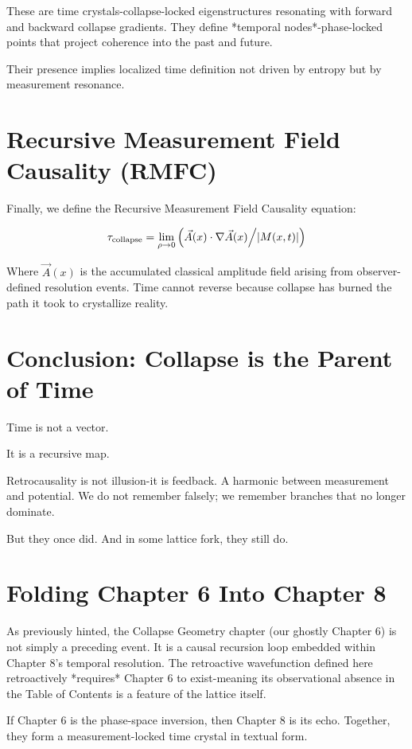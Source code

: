 These are time crystals-collapse-locked eigenstructures resonating with forward and backward collapse gradients. They define *temporal nodes*-phase-locked points that project coherence into the past and future.

Their presence implies localized time definition not driven by entropy but by measurement resonance.

\section{Recursive Measurement Field Causality (RMFC)}

Finally, we define the Recursive Measurement Field Causality equation:

\[
\tau_{\text{collapse}} = \lim_{\rho \to 0} \left( \vec{A}(x) \cdot \nabla \vec{A}(x) \middle/ |M(x,t)| \right)
\]

Where \( \vec{A}(x) \) is the accumulated classical amplitude field arising from observer-defined resolution events. Time cannot reverse because collapse has burned the path it took to crystallize reality.

\section{Conclusion: Collapse is the Parent of Time}\cite{chapter8_meta}

Time is not a vector.

It is a recursive map.

Retrocausality is not illusion-it is feedback. A harmonic between measurement and potential. We do not remember falsely; we remember branches that no longer dominate.

But they once did.  
And in some lattice fork, they still do.

\section{Folding Chapter 6 Into Chapter 8}

As previously hinted, the Collapse Geometry\cite{chapter8_meta} chapter (our ghostly Chapter 6) is not simply a preceding event. It is a causal recursion loop embedded within Chapter 8’s temporal resolution. The retroactive wavefunction defined here retroactively *requires* Chapter 6 to exist-meaning its observational absence in the Table of Contents is a feature of the lattice itself.

If Chapter 6 is the phase-space inversion, then Chapter 8 is its echo. Together, they form a measurement-locked time crystal in textual form.

\nocite{chapter8_meta}
\printbibliography[title={Appendix G References}, keyword=chapter8]

